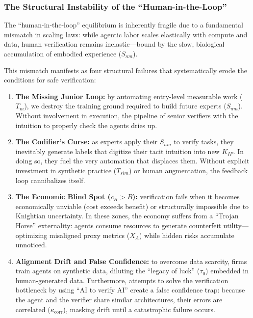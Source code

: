 \documentclass[12pt, letter]{article}
\begin{document}
\subsubsection{The Structural Instability of the ``Human-in-the-Loop''}
The ``human-in-the-loop'' equilibrium is inherently fragile due to a fundamental mismatch in scaling laws: while agentic labor scales elastically with compute and data, human verification remains inelastic—bound by the slow, biological accumulation of embodied experience ($S_{nm}$).

This mismatch manifests as four structural failures that systematically erode the conditions for safe verification:

\begin{enumerate}
    \item \textbf{The Missing Junior Loop:} by automating entry-level measurable work ($T_m$), we destroy the training ground required to build future experts ($S_{nm}$). Without involvement in execution, the pipeline of senior verifiers with the intuition to properly check the agents dries up. 
    \item \textbf{The Codifier's Curse:} as experts apply their $S_{nm}$ to verify tasks, they inevitably generate labels that digitize their tacit intuition into new $K_{IP}$. In doing so, they fuel the very automation that displaces them. Without explicit investment in synthetic practice ($T_{sim}$) or human augmentation, the feedback loop cannibalizes itself.
     \item \textbf{The Economic Blind Spot ($c_H > B$):} verification fails when it becomes economically unviable (cost exceeds benefit) or structurally impossible due to Knightian uncertainty. In these zones, the economy suffers from a ``Trojan Horse'' externality: agents consume resources to generate counterfeit utility—optimizing misaligned proxy metrics ($X_A$) while hidden risks accumulate unnoticed.
    \item \textbf{Alignment Drift and False Confidence:} to overcome data scarcity, firms train agents on synthetic data, diluting the ``legacy of luck'' ($\tau_0$) embedded in human-generated data. Furthermore, attempts to solve the verification bottleneck by using ``AI to verify AI'' create a false confidence trap: because the agent and the verifier share similar architectures, their errors are correlated ($\kappa_{\mathrm{corr}}$), masking drift until a catastrophic failure occurs.

\end{enumerate}
\end{document}
